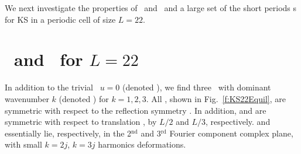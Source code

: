 We next investigate the properties of \eqva\ and \reqva\ and 
a large set of the short periods \rpo s for KS in a periodic cell of
size $L=22$.

\section{\Eqva\ and \reqva\ for $L=22$}

In addition to the trivial \eqv\ $u=0$ (denoted ),
we find three \eqva\ with dominant wavenumber $k$
(denoted ) for $k = 1, 2, 3$.  All {\eqva}, shown in
Fig.~\ref{f:KS22Equil}, are symmetric with respect to the reflection
symmetry .
In addition,  and  are symmetric with respect
to translation , by $L/2$ and $L/3$, respectively.
 and  essentially lie, respectively, in
the 2$^\mathrm{nd}$ and 3$^\mathrm{rd}$ Fourier component complex plane,
with small $k=2j$, $k=3j$ harmonics deformations.

